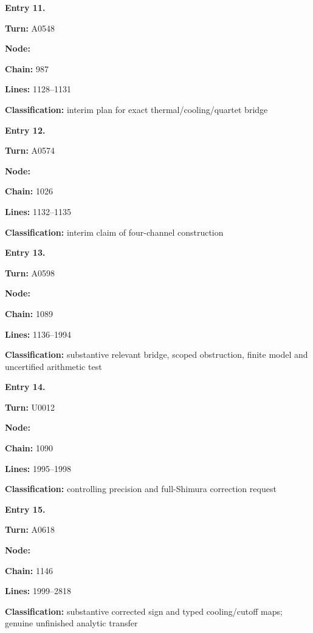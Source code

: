 \textbf{Entry 11.}

\textbf{Turn:} A0548

\textbf{Node:} \protect{}

\textbf{Chain:} 987

\textbf{Lines:} 1128--1131

\textbf{Classification:} interim plan for exact thermal/cooling/quartet
bridge


\textbf{Entry 12.}

\textbf{Turn:} A0574

\textbf{Node:} \protect{}

\textbf{Chain:} 1026

\textbf{Lines:} 1132--1135

\textbf{Classification:} interim claim of four-channel construction


\textbf{Entry 13.}

\textbf{Turn:} A0598

\textbf{Node:} \protect{}

\textbf{Chain:} 1089

\textbf{Lines:} 1136--1994

\textbf{Classification:} substantive relevant bridge, scoped
obstruction, finite model and uncertified arithmetic test


\textbf{Entry 14.}

\textbf{Turn:} U0012

\textbf{Node:} \protect{}

\textbf{Chain:} 1090

\textbf{Lines:} 1995--1998

\textbf{Classification:} controlling precision and full-Shimura
correction request


\textbf{Entry 15.}

\textbf{Turn:} A0618

\textbf{Node:} \protect{}

\textbf{Chain:} 1146

\textbf{Lines:} 1999--2818

\textbf{Classification:} substantive corrected sign and typed
cooling/cutoff maps; genuine unfinished analytic transfer


